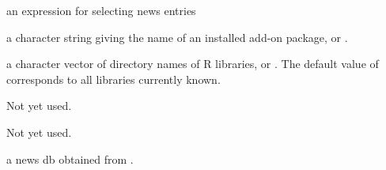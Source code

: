 %
\begin{Arguments}
\begin{ldescription}
\item[\code{query}] an expression for selecting news entries
\item[\code{package}] a character string giving the name of an installed
add-on package, or .
\item[\code{lib.loc}] a character vector of directory names of R libraries,
or .  The default value of  corresponds to all
libraries currently known.
\item[\code{format}] Not yet used.
\item[\code{reader}] Not yet used.
\item[\code{db}] a news db obtained from .
\end{ldescription}
\end{Arguments}
%

